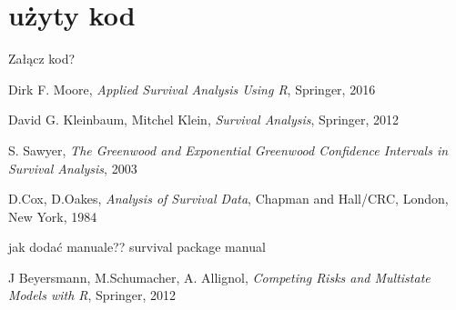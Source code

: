 \documentclass[]{pracamgr}
\begin{document}
\section{użyty kod}

Załącz kod?


\begin{thebibliography}{99}

 Dirk F. Moore, \textit{Applied Survival Analysis Using R}, Springer, 2016

 David G. Kleinbaum, Mitchel Klein, \textit{Survival Analysis}, Springer, 2012

 S. Sawyer, \textit{The Greenwood and Exponential Greenwood Confidence Intervals in Survival Analysis}, 2003

 D.Cox, D.Oakes, \textit{Analysis of Survival Data}, Chapman and Hall/CRC, London, New York, 1984

 {\color{red}jak dodać manuale??} survival package manual

 J Beyersmann, M.Schumacher, A. Allignol, \textit{Competing Risks and Multistate Models with R}, Springer, 2012

\end{thebibliography}
\end{document}
